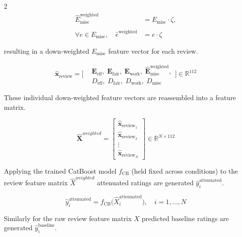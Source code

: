 \documentclass{article}
\begin{document}
\begin{multicols*}{2}
\begin{equation}
\begin{aligned}
    \hat{E}_{\text{misc}}^{\text{weighted}} &= E_{\text{misc}} \cdot \zeta, \\\\
    \forall e \in E_{\text{misc}}, \quad \hat{e}^{\text{weighted}} &= e \cdot \zeta
\end{aligned}
\end{equation}\newline

resulting in a down-weighted $E_{\text{misc}}$ feature vector for each review.

\begin{equation}
\mathbf{\hat{x}}_{\text{review}} =
\Big[
\begin{aligned}
&\mathbf{E}_{\text{eff}}, \;\mathbf{E}_{\text{fair}}, \;\mathbf{E}_{\text{work}}, \;\hat{\mathbf{E}}_{\text{misc}}^{\text{weighted}},\\
& D_{\text{eff}}, \; D_{\text{fair}}, \; D_{\text{work}}, \; D_{\text{misc}}
\end{aligned}
\Big]
\in \mathbb{R}^{112}
\end{equation}\newline

These individual down-weighted feature vectors are reassembled into a feature matrix.

\begin{equation}
\hat{\mathbf{X}}^{weighted} =
\begin{bmatrix}
\hat{\mathbf{x}}_{\text{review}_1} \\
\hat{\mathbf{x}}_{\text{review}_2} \\
\vdots \\
\hat{\mathbf{x}}_{\text{review}_N}
\end{bmatrix}
\in \mathbb{R}^{N \times 112}
\end{equation}\newline

Applying the trained CatBoost model $f_\mathrm{CB}$ (held fixed across conditions) to the review feature matrix $\hat{X}^{weighted}$ attenuated ratings are generated $\hat{y}_i^\text{attenuated}$.

\begin{equation}
\hat{y}_i^\text{attenuated} = f_\mathrm{CB}\big(\hat{X}_i^\text{attenuated}\big), \quad i = 1, \dots, N
\end{equation}\newline

Similarly for the raw review feature matrix $X$ predicted baseline ratings are generated $\hat{y}_i^\text{baseline}$.


\end{multicols*}
\end{document}
